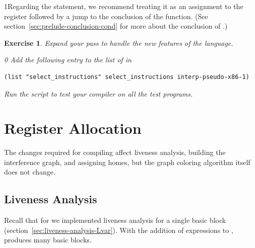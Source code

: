 \documentclass[7x10]{TimesAPriori_MIT}%
\def\racketEd{0}
\def\pythonEd{1}
\providecommand{\BookEdition}{1}
\let\edition\BookEdition
\newcommand{\pythonColor}[0]{}
\newcommand{\python}[1]{{\if\edition\pythonEd\pythonColor #1\fi}}
\newtheorem{exercise}[theorem]{Exercise}
\numberwithin{theorem}{chapter}
\numberwithin{definition}{chapter}
\numberwithin{equation}{chapter}
\begin{document}
\python{Regarding the  statement, we recommend treating it
  as an assignment to the \key{rax} register followed by a jump to the
  conclusion of the \code{main} function. (See section~\ref{sec:prelude-conclusion-cond} for more about the conclusion of \code{main}.)}

\begin{exercise}\normalfont\normalsize
Expand your  pass to handle the new
features of the \LangCIf{} language.
%
{\if\edition\racketEd
Add the following entry to the list of  in
\begin{lstlisting}
(list "select_instructions" select_instructions interp-pseudo-x86-1)
\end{lstlisting}
\fi}
%
Run the script to test your compiler on all the test programs.
\end{exercise}

\section{Register Allocation}
\label{sec:register-allocation-Lif}

The changes required for compiling \LangIf{} affect liveness analysis,
building the interference graph, and assigning homes, but the graph
coloring algorithm itself does not change.

\subsection{Liveness Analysis}
\label{sec:liveness-analysis-Lif}

Recall that for \LangVar{} we implemented liveness analysis for a
single basic block (section~\ref{sec:liveness-analysis-Lvar}).  With
the addition of  expressions to \LangIf{},
 produces many basic blocks.

\end{document}
